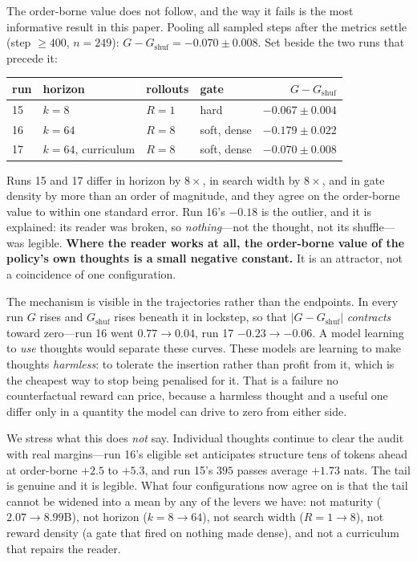 \documentclass{article} %
\newcommand{\gain}{G}
\begin{document}
The order-borne value does not follow, and the way it fails is the most informative result in this paper. Pooling all sampled steps after the metrics settle (step ${\ge}400$, $n{=}249$): $\gain - \gain_{\mathrm{shuf}} = -0.070 \pm 0.008$. Set beside the two runs that precede it:

\begin{center}\small
\begin{tabular}{llllr}
\toprule
run & horizon & rollouts & gate & $\gain - \gain_{\mathrm{shuf}}$ \\
\midrule
15 & $k{=}8$ & $R{=}1$ & hard & $-0.067 \pm 0.004$ \\
16 & $k{=}64$ & $R{=}8$ & soft, dense & $-0.179 \pm 0.022$ \\
17 & $k{=}64$, curriculum & $R{=}8$ & soft, dense & $-0.070 \pm 0.008$ \\
\bottomrule
\end{tabular}
\end{center}

Runs 15 and 17 differ in horizon by $8\times$, in search width by $8\times$, and in gate density by more than an order of magnitude, and they agree on the order-borne value to within one standard error. Run 16's $-0.18$ is the outlier, and it is explained: its reader was broken, so \emph{nothing}---not the thought, not its shuffle---was legible. \textbf{Where the reader works at all, the order-borne value of the policy's own thoughts is a small negative constant.} It is an attractor, not a coincidence of one configuration.

The mechanism is visible in the trajectories rather than the endpoints. In every run $\gain$ rises and $\gain_{\mathrm{shuf}}$ rises beneath it in lockstep, so that $|\gain - \gain_{\mathrm{shuf}}|$ \emph{contracts} toward zero---run 16 went $0.77 \to 0.04$, run 17 $-0.23 \to -0.06$. A model learning to \emph{use} thoughts would separate these curves. These models are learning to make thoughts \emph{harmless}: to tolerate the insertion rather than profit from it, which is the cheapest way to stop being penalised for it. That is a failure no counterfactual reward can price, because a harmless thought and a useful one differ only in a quantity the model can drive to zero from either side.

We stress what this does \emph{not} say. Individual thoughts continue to clear the audit with real margins---run 16's eligible set anticipates structure tens of tokens ahead at order-borne $+2.5$ to $+5.3$, and run 15's $395$ passes average $+1.73$ nats. The tail is genuine and it is legible. What four configurations now agree on is that the tail cannot be widened into a mean by any of the levers we have: not maturity ($2.07 \to 8.99$B), not horizon ($k{=}8 \to 64$), not search width ($R{=}1 \to 8$), not reward density (a gate that fired on nothing made dense), and not a curriculum that repairs the reader.
\end{document}
